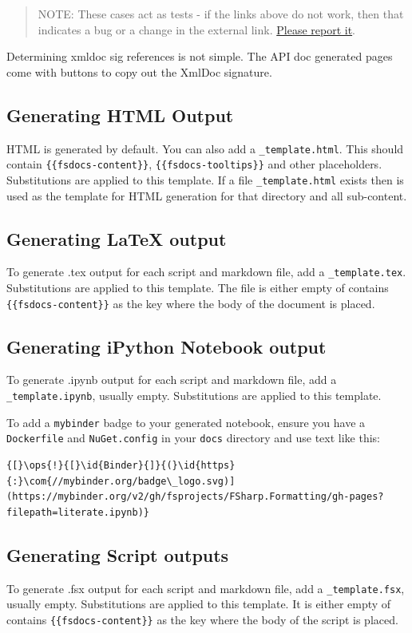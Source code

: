 \documentclass{article}
\newcommand{\id}[1]{\textcolor{black}{#1}}
\newcommand{\com}[1]{\textcolor{officegreen}{#1}}
\newcommand{\ops}[1]{\textcolor{purple}{#1}}
\begin{document}
\begin{quote}


NOTE: These cases act as tests - if the links above do not work, then that indicates a bug or a change in the
external link. \href{https://github.com/fsprojects/FSharp.Formatting/issues/new}{Please report it}.
\end{quote}



Determining xmldoc sig references is not simple.  The API doc generated pages come with
buttons to copy out the XmlDoc signature.
\subsection*{Generating HTML Output}



HTML is generated by default. You can also add a \texttt{\_template.html}.  This should contain \texttt{\{\{fsdocs-content\}\}},  \texttt{\{\{fsdocs-tooltips\}\}}
and other placeholders. Substitutions are
applied to this template.
If a file \texttt{\_template.html} exists then is used as the template for HTML generation for that directory and all sub-content.
\subsection*{Generating LaTeX output}



To generate .tex output for each script and markdown file, add a \texttt{\_template.tex}. Substitutions are
applied to this template. The file is either empty of contains \texttt{\{\{fsdocs-content\}\}} as the key where the body
of the document is placed.
\subsection*{Generating iPython Notebook output}



To generate .ipynb output for each script and markdown file, add a \texttt{\_template.ipynb}, usually empty. Substitutions are
applied to this template.


To add a \texttt{mybinder} badge to your generated notebook, ensure you have a \texttt{Dockerfile} and \texttt{NuGet.config}
in your \texttt{docs} directory and use text like this:
\begin{Verbatim}[commandchars=\\\{\}]
{[}\ops{!}{[}\id{Binder}{]}{(}\id{https}{:}\com{//mybinder.org/badge\_logo.svg)](https://mybinder.org/v2/gh/fsprojects/FSharp.Formatting/gh-pages?filepath=literate.ipynb)}

\end{Verbatim}

\subsection*{Generating Script outputs}



To generate .fsx output for each script and markdown file, add a \texttt{\_template.fsx}, usually empty. Substitutions are
applied to this template. It is either empty of contains \texttt{\{\{fsdocs-content\}\}} as the key where the body
of the script is placed.
\end{document}
